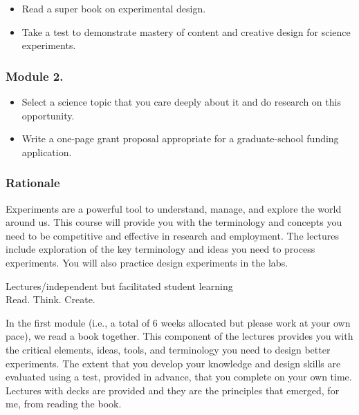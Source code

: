 \documentclass[
]{book}
\providecommand{\tightlist}{%
  \setlength{\itemsep}{0pt}\setlength{\parskip}{0pt}}
\begin{document}
\begin{itemize}
\tightlist
\item
  Read a super book on experimental design.\\
\item
  Take a test to demonstrate mastery of content and creative design for science experiments.
\end{itemize}

\hypertarget{module-2.}{%
\subsubsection*{Module 2.}\label{module-2.}}

\begin{itemize}
\tightlist
\item
  Select a science topic that you care deeply about it and do research on this opportunity.\\
\item
  Write a one-page grant proposal appropriate for a graduate-school funding application.
\end{itemize}

\hypertarget{rationale}{%
\subsubsection*{Rationale}\label{rationale}}

Experiments are a powerful tool to understand, manage, and explore the world around us. This course will provide you with the terminology and concepts you need to be competitive and effective in research and employment. The lectures include exploration of the key terminology and ideas you need to process experiments. You will also practice design experiments in the labs.

Lectures/independent but facilitated student learning\\
Read. Think. Create.

In the first module (i.e., a total of 6 weeks allocated but please work at your own pace), we read a book together. This component of the lectures provides you with the critical elements, ideas, tools, and terminology you need to design better experiments. The extent that you develop your knowledge and design skills are evaluated using a test, provided in advance, that you complete on your own time. Lectures with decks are provided and they are the principles that emerged, for me, from reading the book.
\end{document}
